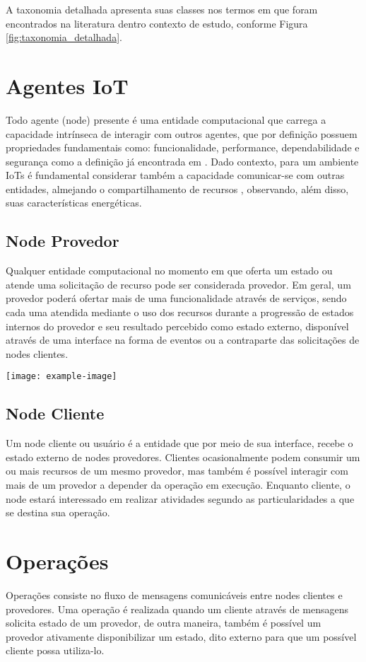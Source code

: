A taxonomia detalhada apresenta suas classes nos termos em que foram encontrados na literatura dentro contexto de estudo, conforme Figura \ref{fig:taxonomia_detalhada}.

\section{Agentes \acs{IoT}}
Todo agente (node) presente é uma entidade computacional que carrega a capacidade intrínseca de interagir com outros agentes, que por definição possuem propriedades fundamentais como: funcionalidade, performance, dependabilidade e segurança como a definição já encontrada em \cite{avizienis_basic_2004}. Dado contexto, para um ambiente \acp{IoT} é fundamental considerar também a capacidade comunicar-se com outras entidades, almejando o compartilhamento de recursos \cite{li_internet_2015}, observando, além disso, suas características energéticas. 


\subsection{Node Provedor}
Qualquer entidade computacional no momento em que oferta um estado ou atende uma solicitação de recurso pode ser considerada provedor. Em geral, um provedor poderá ofertar mais de uma funcionalidade através de serviços, sendo cada uma atendida mediante o uso dos recursos durante a progressão de estados internos do provedor e seu resultado percebido como estado externo, disponível através de uma interface na forma de eventos ou a contraparte das solicitações de nodes clientes.

\noindent\texttt{[image: example-image]} 

\subsection{Node Cliente}
Um node cliente ou usuário é a entidade que por meio de sua interface, recebe o estado externo de nodes provedores. Clientes ocasionalmente podem consumir um ou mais recursos de um mesmo provedor, mas também é possível interagir com mais de um provedor a depender da operação em execução. Enquanto cliente, o node estará interessado em realizar atividades segundo as particularidades a que se destina sua operação.

\section{Operações}
Operações consiste no fluxo de mensagens comunicáveis entre nodes clientes e provedores. Uma operação é realizada quando um cliente através de mensagens solicita estado de um provedor, de outra maneira, também é possível um provedor ativamente disponibilizar um estado, dito externo para que um possível cliente possa utiliza-lo. 

